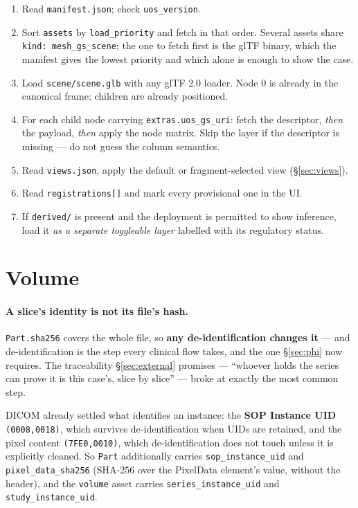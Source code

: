 \documentclass[11pt,a4paper]{article}
\newcommand{\code}[1]{\texttt{\small #1}}
\begin{document}
\begin{enumerate}
  \item Read \code{manifest.json}; check \code{uos\_version}.
  \item Sort \code{assets} by \code{load\_priority} and fetch in that order. Several
  assets share \code{kind: mesh\_gs\_scene}; the one to fetch first is the glTF binary,
  which the manifest gives the lowest priority and which alone is enough to show the case.
  \item Load \code{scene/scene.glb} with any glTF 2.0 loader. Node 0 is already in the
  canonical frame; children are already positioned.
  \item For each child node carrying \code{extras.uos\_gs\_uri}: fetch the descriptor,
  \emph{then} the payload, \emph{then} apply the node matrix. Skip the layer if the
  descriptor is missing --- do not guess the column semantics.
  \item Read \code{views.json}, apply the default or fragment-selected view
  (\S\ref{sec:views}).
  \item Read \code{registrations[]} and mark every provisional one in the UI.
  \item If \code{derived/} is present and the deployment is permitted to show inference,
  load it \emph{as a separate toggleable layer} labelled with its regulatory status.
\end{enumerate}

\section{Volume}\label{sec:volume}

\paragraph{A slice's identity is not its file's hash.}\label{par:sliceid}
\code{Part.sha256} covers the whole file, so \textbf{any de-identification changes it} ---
and de-identification is the step every clinical flow takes, and the one \S\ref{sec:phi}
now requires. The traceability \S\ref{sec:external} promises --- ``whoever holds the series
can prove it is this case's, slice by slice'' --- broke at exactly the most common step.

DICOM already settled what identifies an instance: the \textbf{SOP Instance UID}
\code{(0008,0018)}, which survives de-identification when UIDs are retained, and the pixel
content \code{(7FE0,0010)}, which de-identification does not touch unless it is explicitly
cleaned. So \code{Part} additionally carries \code{sop\_instance\_uid} and
\code{pixel\_data\_sha256} (SHA-256 over the PixelData element's value, without the
header), and the \code{volume} asset carries \code{series\_instance\_uid} and
\code{study\_instance\_uid}.
\end{document}
